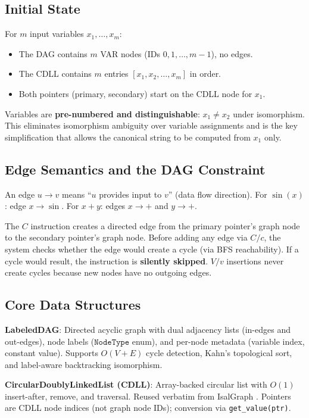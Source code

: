 \subsection{Initial State}

For $m$ input variables $x_1, \ldots, x_m$:
\begin{itemize}[nosep]
  \item The DAG contains $m$ VAR nodes (IDs $0, 1, \ldots, m-1$), no edges.
  \item The CDLL contains $m$ entries $[x_1, x_2, \ldots, x_m]$ in order.
  \item Both pointers (primary, secondary) start on the CDLL node for $x_1$.
\end{itemize}

Variables are \textbf{pre-numbered and distinguishable}: $x_1 \neq x_2$ under
isomorphism. This eliminates isomorphism ambiguity over variable assignments
and is the key simplification that allows the canonical string to be computed
from $x_1$ only.

\subsection{Edge Semantics and the DAG Constraint}

An edge $u \to v$ means ``$u$ provides input to $v$'' (data flow direction).
For $\sin(x)$: edge $x \to \sin$. For $x + y$: edges $x \to +$ and $y \to +$.

The $C$ instruction creates a directed edge from the primary pointer's graph
node to the secondary pointer's graph node. Before adding any edge via $C/c$,
the system checks whether the edge would create a cycle (via BFS reachability).
If a cycle would result, the instruction is \textbf{silently skipped}.
$V/v$ insertions never create cycles because new nodes have no outgoing edges.

\subsection{Core Data Structures}

\textbf{LabeledDAG}: Directed acyclic graph with dual adjacency lists
(in-edges and out-edges), node labels ($\texttt{NodeType}$ enum), and per-node
metadata (variable index, constant value). Supports $O(V+E)$ cycle detection,
Kahn's topological sort, and label-aware backtracking isomorphism.

\textbf{CircularDoublyLinkedList (CDLL)}: Array-backed circular list with $O(1)$
insert-after, remove, and traversal. Reused verbatim from IsalGraph
\cite{lopezrubio2025}. Pointers are CDLL node indices (not graph node IDs);
conversion via \texttt{get\_value(ptr)}.
